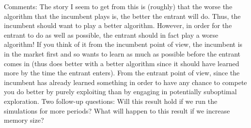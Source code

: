 \documentclass[11pt,letterpaper]{article}
\begin{document}
Comments: The story I seem to get from this is (roughly) that the worse the algorithm that the incumbent plays is, the better the entrant will do. Thus, the incumbent should want to play a better algorithm. However, in order for the entrant to do as well as possible, the entrant should in fact play a worse algorithm! If you think of it from the incumbent point of view, the incumbent is in the market first and so wants to learn as much as possible before the entrant comes in (thus does better with a better algorithm since it should have learned more by the time the entrant enters).  From the entrant point of view, since the incumbent has already learned something in order to have any chance to compete you do better by purely exploiting than by engaging in potentially suboptimal exploration. Two follow-up questions: Will this result hold if we run the simulations for more periods? What will happen to this result if we increase memory size?
\end{document}
